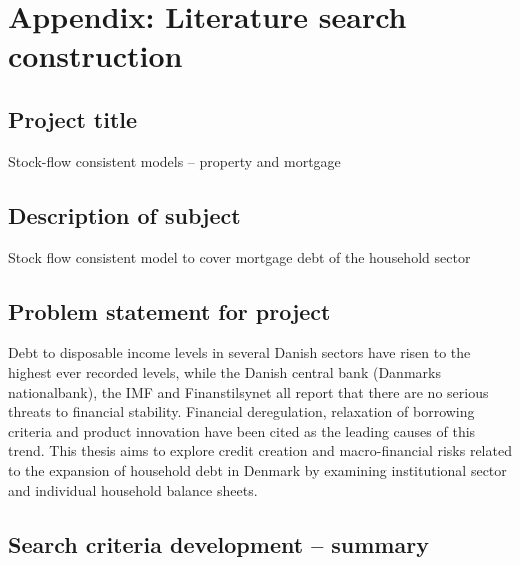 \documentclass[
]{book}
\begin{document}
\hypertarget{appendix-literature-search-construction}{%
\chapter{Appendix: Literature search construction}\label{appendix-literature-search-construction}}

\hypertarget{project-title}{%
\section{Project title}\label{project-title}}

Stock-flow consistent models -- property and mortgage

\hypertarget{description-of-subject}{%
\section{Description of subject}\label{description-of-subject}}

Stock flow consistent model to cover mortgage debt of the household sector

\hypertarget{problem-statement-for-project}{%
\section{Problem statement for project}\label{problem-statement-for-project}}

Debt to disposable income levels in several Danish sectors have risen to the highest ever recorded levels, while the Danish central bank (Danmarks nationalbank), the IMF and Finanstilsynet all report that there are no serious threats to financial stability. Financial deregulation, relaxation of borrowing criteria and product innovation have been cited as the leading causes of this trend. This thesis aims to explore credit creation and macro-financial risks related to the expansion of household debt in Denmark by examining institutional sector and individual household balance sheets.

\hypertarget{search-criteria-development-summary}{%
\section{Search criteria development -- summary}\label{search-criteria-development-summary}}
\end{document}
